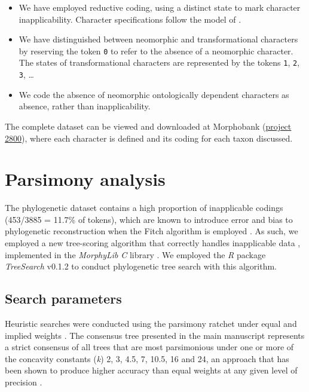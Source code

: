 \documentclass[]{book}
\theoremstyle{definition}
\theoremstyle{definition}
\theoremstyle{definition}
\theoremstyle{remark}
\begin{document}
\begin{itemize}
\item
  We have employed reductive coding, using a distinct state to mark
  character inapplicability. Character specifications follow the model
  of \citet{Sereno2007}.
\item
  We have distinguished between neomorphic and transformational
  characters \citep[sensu][]{Sereno2007} by reserving the token
  \texttt{0} to refer to the absence of a neomorphic character. The
  states of transformational characters are represented by the tokens
  \texttt{1}, \texttt{2}, \texttt{3}, \ldots{}
\item
  We code the absence of neomorphic ontologically dependent characters
  \citep[sensu][]{Vogt2017} as absence, rather than inapplicability.
\end{itemize}

The complete dataset can be viewed and downloaded at Morphobank
(\href{https://morphobank.org/permalink/?P2800}{project 2800}), where
each character is defined and its coding for each taxon discussed.

\hypertarget{treesearch}{%
\chapter{Parsimony analysis}\label{treesearch}}

The phylogenetic dataset contains a high proportion of inapplicable
codings (453/3885 = 11.7\% of tokens), which are known to introduce
error and bias to phylogenetic reconstruction when the Fitch algorithm
is employed \citep{Maddison1993, Brazeau2018}. As such, we employed a
new tree-scoring algorithm that correctly handles inapplicable data
\citep{Brazeau2018}, implemented in the \emph{MorphyLib} \emph{C}
library \citep{Brazeau2017Morphylib}. We employed the \emph{R} package
\emph{TreeSearch} v0.1.2 \citep{Smith2018TreeSearch} to conduct
phylogenetic tree search with this algorithm.

\hypertarget{search-parameters}{%
\section{Search parameters}\label{search-parameters}}

Heuristic searches were conducted using the parsimony ratchet
\citep{Nixon1999} under equal and implied weights \citep{Goloboff1997}.
The consensus tree presented in the main manuscript represents a strict
consensus of all trees that are most parsimonious under one or more of
the concavity constants (\emph{k}) 2, 3, 4.5, 7, 10.5, 16 and 24, an
approach that has been shown to produce higher accuracy than equal
weights at any given level of precision \citep{Smith2017}.
\end{document}
